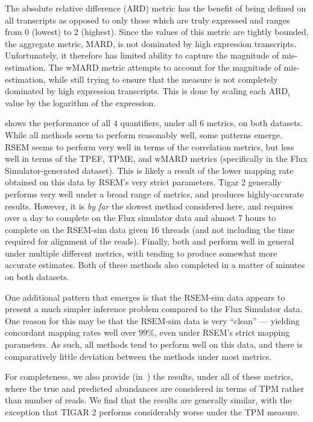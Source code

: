 The absolute relative difference (ARD) metric has the benefit of being defined on all transcripts as opposed to only those which are truly expressed and ranges from $0$ (lowest) to $2$ (highest).  Since the values of this metric are tightly bounded, the aggregate metric, MARD, is not dominated by high expression transcripts.  Unfortunately, it therefore has limited ability to capture the magnitude of  mis-estimation.  The wMARD metric attempts to account for the magnitude of mis-estimation, while still trying to ensure that the measure is not completely dominated by high expression transcripts.  This is done by scaling each ARD$_i$ value by the logarithm of the expression.

 shows the performance of all $4$ quantifiers, under all $6$ metrics, on both datasets.  While all methods seem to perform reasonably well, some patterns emerge.  RSEM seems to perform very well in terms of the correlation metrics, but less well in terms of the TPEF, TPME, and wMARD metrics (specifically in the Flux Simulator-generated dataset).  This is likely a result of the lower mapping rate obtained on this data by RSEM's very strict \bt parameters.  Tigar 2 generally performs very well under a broad range of metrics, and produces highly-accurate results.  However, it is \textit{by far} the slowest method considered here, and requires over a day to complete on the Flux simulator data and almost 7 hours to complete on the RSEM-sim data given $16$ threads (and not including the time required for \bt alignment of the reads).  Finally, both \quasiSF and \kallisto perform well in general under multiple different metrics, with \quasiSF tending to produce somewhat more accurate estimates.  Both of these methods also completed
in a matter of minutes on both datasets.

One additional pattern that emerges is that the RSEM-sim data appears to present a much simpler inference problem compared to the Flux Simulator data.  One reason for this may be that the RSEM-sim data is very ``clean'' --- yielding concordant mapping rates well over $99\%$, even under RSEM's strict \bt mapping parameters.  As such, all methods tend to perform well on this data, and there is comparatively little deviation between the methods under most metrics.

For completeness, we also provide (in~) the results, under all of these metrics, where the true and predicted abundances are considered in terms of TPM rather than number of reads.  We find that the results are generally similar, with the exception that TIGAR 2 performs considerably worse under the TPM measure.

